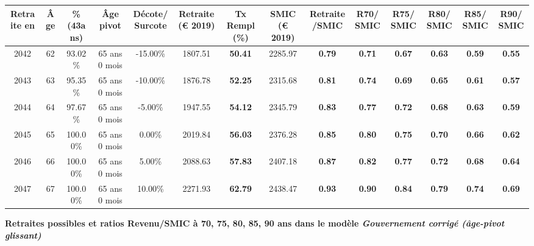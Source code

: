 \begin{adjustbox}{max width=\textwidth} 
\begin{tabular}[htb]{|c|c||c|c|c||c|c||c|c||c|c|c|c|c|} 
\hline 
 Retraite en &  Âge &  \%(43ans) &  Âge pivot &  Décote/Surcote &  Retraite (\euro{} 2019) &  Tx Rempl(\%) &  SMIC (\euro{} 2019) &  Retraite/SMIC &  R70/SMIC &  R75/SMIC &  R80/SMIC &  R85/SMIC &  R90/SMIC \\ 
\hline \hline 
 2042 &  62 &  93.02\% &  65 ans 0 mois &  -15.00\% &  1807.51 &  {\bf 50.41} &  2285.97 &  {\bf {\color{red} 0.79}} &  {\bf {\color{red} 0.71}} &  {\bf {\color{red} 0.67}} &  {\bf {\color{red} 0.63}} &  {\bf {\color{red} 0.59}} &  {\bf {\color{red} 0.55}} \\ 
\hline 
 2043 &  63 &  95.35\% &  65 ans 0 mois &  -10.00\% &  1876.78 &  {\bf 52.25} &  2315.68 &  {\bf {\color{red} 0.81}} &  {\bf {\color{red} 0.74}} &  {\bf {\color{red} 0.69}} &  {\bf {\color{red} 0.65}} &  {\bf {\color{red} 0.61}} &  {\bf {\color{red} 0.57}} \\ 
\hline 
 2044 &  64 &  97.67\% &  65 ans 0 mois &  -5.00\% &  1947.55 &  {\bf 54.12} &  2345.79 &  {\bf {\color{red} 0.83}} &  {\bf {\color{red} 0.77}} &  {\bf {\color{red} 0.72}} &  {\bf {\color{red} 0.68}} &  {\bf {\color{red} 0.63}} &  {\bf {\color{red} 0.59}} \\ 
\hline 
 2045 &  65 &  100.00\% &  65 ans 0 mois &  0.00\% &  2019.84 &  {\bf 56.03} &  2376.28 &  {\bf {\color{red} 0.85}} &  {\bf {\color{red} 0.80}} &  {\bf {\color{red} 0.75}} &  {\bf {\color{red} 0.70}} &  {\bf {\color{red} 0.66}} &  {\bf {\color{red} 0.62}} \\ 
\hline 
 2046 &  66 &  100.00\% &  65 ans 0 mois &  5.00\% &  2088.63 &  {\bf 57.83} &  2407.18 &  {\bf {\color{red} 0.87}} &  {\bf {\color{red} 0.82}} &  {\bf {\color{red} 0.77}} &  {\bf {\color{red} 0.72}} &  {\bf {\color{red} 0.68}} &  {\bf {\color{red} 0.64}} \\ 
\hline 
 2047 &  67 &  100.00\% &  65 ans 0 mois &  10.00\% &  2271.93 &  {\bf 62.79} &  2438.47 &  {\bf {\color{red} 0.93}} &  {\bf {\color{red} 0.90}} &  {\bf {\color{red} 0.84}} &  {\bf {\color{red} 0.79}} &  {\bf {\color{red} 0.74}} &  {\bf {\color{red} 0.69}} \\ 
\hline 
\hline 
\end{tabular} 
\end{adjustbox} 
 
 \vspace{0.1cm} 
{\bf \noindent Retraites possibles et ratios Revenu/SMIC à 70, 75, 80, 85, 90 ans dans le modèle \emph{Gouvernement corrigé (âge-pivot glissant)}}  
 
